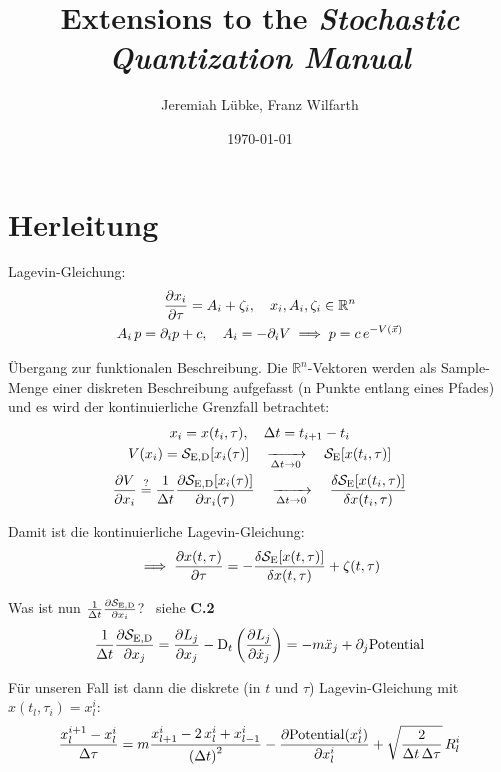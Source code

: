 \documentclass[11pt,a4paper]{scrartcl}
\title{Extensions to the \emph{Stochastic Quantization Manual}}
\author{Jeremiah Lübke, Franz Wilfarth}
\date{\today}
\newcommand{\DT}{\ensuremath{\mathrm{D}_t}}
\newcommand{\SE}{\ensuremath{\mathcal{S}_{\mathrm{E}}}}
\newcommand{\SED}{\ensuremath{\mathcal{S}_{\mathrm{E,D}}}}
\begin{document}
\maketitle

\section*{Herleitung}
Lagevin-Gleichung:
\begin{gather*}
    \pdv{x_i}{\tau}=A_i+\zeta_i \qc x_i, A_i, \zeta_i \in \mathbb{R}^n \\
    A_i\,p=\partial_i{p}+c \qc A_i=-\partial_i{V} \implies
    p=c\,e^{-V(\vec{x})}
\end{gather*}

Übergang zur funktionalen Beschreibung.
Die $\mathbb{R}^n$-Vektoren werden als Sample-Menge einer diskreten Beschreibung
aufgefasst (n Punkte entlang eines Pfades) und es wird der kontinuierliche
Grenzfall betrachtet:
\begin{gather*}
    x_i=x(t_i,\tau) \qc \Delta{t}=t_{i+1}-t_i \\
    V(x_i)=\SED[x_i(\tau)]
    \quad\xrightarrow[\Delta{t}\to{0}]{}\quad
    \SE[x(t_i, \tau)] \\
    \pdv{V}{x_i}
    \overset{?}{=}
    \frac{1}{\Delta{t}}\pdv{\SED[x_i(\tau)]}{x_i(\tau)}
    \quad\xrightarrow[\Delta{t}\to{0}]{}\quad
    \fdv{\SE[x(t_i,\tau)]}{x(t_i,\tau)}
\end{gather*}

Damit ist die kontinuierliche Lagevin-Gleichung:
\begin{equation*}
    \implies\pdv{x(t,\tau)}{\tau}=-\fdv{\SE[x(t,\tau)]}{x(t,\tau)}+\zeta(t,\tau)
\end{equation*}


Was ist nun $\frac{1}{\Delta{t}}\pdv{\SED}{x_i}$? \textrightarrow~siehe \textbf{C.2}
\begin{equation*}
    \frac{1}{\Delta{t}}\pdv{\SED}{x_j}=\pdv{L_j}{x_j}-\DT\left(\pdv{L_j}{\dot{x}_j}\right)
    =-m\ddot{x}_j+\partial_j{\mathrm{Potential}}
\end{equation*}

Für unseren Fall ist dann die diskrete (in $t$ und $\tau$) Lagevin-Gleichung mit
$x(t_l,\tau_i)=x_l^i$:
\begin{equation*}
    \frac{x_l^{i+1}-x_l^i}{\Delta\tau}=m\frac{x_{l+1}^i-2\,x_l^i+x_{l-1}^i}{\left(\Delta{t}\right)^2}-\pdv{\mathrm{Potential}(x_l^i)}{x_l^i}+\sqrt{\frac{2}{\Delta{t}\,\Delta\tau}}\,R_l^i
\end{equation*}
\end{document}
